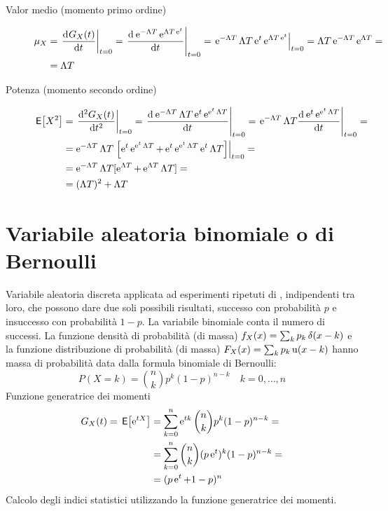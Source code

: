 \begin{description}
\item[Valor medio (momento primo ordine)]
\begin{equation}\begin{split}\mu_X&=\restrict{\deriv{G_X(t)}{t}}{t=0}=\restrict{\deriv{\e{-\Lambda T}\e{\Lambda T\e{t}}}{t}}{t=0}=\restrict{\e{-\Lambda T}{\Lambda T}\e{t}\e{\Lambda T\e{t}}}{t=0}=\Lambda T \e{-\Lambda T}\e{\Lambda T}=\\&=\Lambda T\end{split}\end{equation}

\item[Potenza (momento secondo ordine)]
\begin{equation}\begin{split}\E{X^2}&=\restrict{\deriv[2]{G_X(t)}{t}}{t=0}=
\restrict{\deriv{\e{-\Lambda T}{\Lambda T}\e{t}\e{\e{t}\Lambda T}}{t}}{t=0}=
\restrict{\e{-\Lambda T}{\Lambda T}\deriv{\e{t}\e{\e{t}\Lambda T}}{t}}{t=0}=\\
&={\e{-\Lambda T}\Lambda T}\restrict{\left[\e{t}\e{\e{t}\Lambda T}+\e{t}\e{\e{t}\Lambda T}{\e{t}\Lambda T}\right]}{t=0}=\\
&={\e{-\Lambda T}\Lambda T}[\e{\Lambda T}+\e{\Lambda T}{\Lambda T}]=\\&=(\Lambda T)^2+\Lambda T
\end{split}\end{equation}
\end{description}

\section{Variabile aleatoria binomiale o di Bernoulli}
Variabile aleatoria discreta applicata ad esperimenti ripetuti di , indipendenti tra loro, che possono dare due soli possibili risultati, successo con probabilità $p$ e insuccesso con probabilità $1-p$. La variabile binomiale conta il numero di successi.
La funzione densità di probabilità (di massa) $f_X(x)=\sum_k p_k \impulse(x-k)$ e la funzione distribuzione di probabilità (di massa) $F_X(x)=\sum_k p_k \step(x-k)$ hanno massa di probabilità data dalla formula binomiale di Bernoulli:
\begin{equation}
P(X=k)=\binom{n}{k} p^k (1-p)^{n-k}\quad k=0,\dots,n
\end{equation}
Funzione generatrice dei momenti
\begin{equation}\begin{split}G_X(t)=\E{\e{t X}}&=\sum_{k=0}^{n}{\e{t k}\binom{n}{k}p^k(1-p)^{n-k}}=\\&=\sum_{k=0}^{n}{\binom{n}{k}(p\e{t})^k(1-p)^{n-k}}=\\
&=(p\e{t}+1-p)^n\end{split}\end{equation}
Calcolo degli indici statistici utilizzando la funzione generatrice dei momenti.\\

